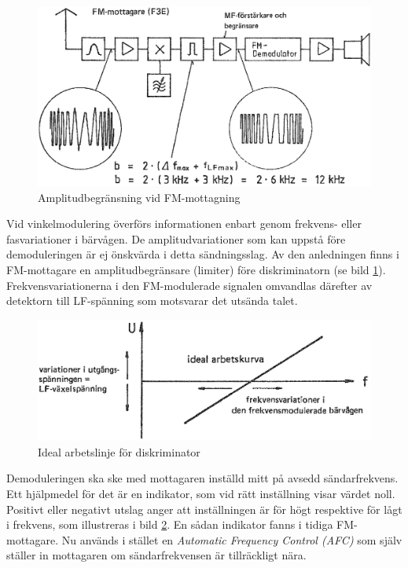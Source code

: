 \begin{figure}
\includegraphics[width=\textwidth]{images/cropped_pdfs/bild_2_3-57.pdf}
\caption{Amplitudbegränsning vid FM-mottagning}
\label{fig:BildII3-57}
\end{figure}

Vid vinkelmodulering överförs informationen enbart genom frekvens-
eller fasvariationer i bärvågen.
De amplitudvariationer som kan uppstå före demoduleringen är ej önskvärda i
detta sändningsslag.
Av den anledningen finns i FM-mottagare en amplitudbegränsare (limiter) före
diskriminatorn (se bild \ref{fig:BildII3-57}).
Frekvensvariationerna i den FM-modulerade signalen omvandlas därefter av
detektorn till LF-spänning som motsvarar det utsända talet.

\begin{figure}
\includegraphics[width=\textwidth]{images/cropped_pdfs/bild_2_3-58.pdf}
\caption{Ideal arbetslinje för diskriminator}
\label{fig:BildII3-58}
\end{figure}

Demoduleringen ska ske med mottagaren inställd mitt på avsedd sändarfrekvens.
Ett hjälpmedel för det är en indikator, som vid rätt inställning visar värdet
noll.
Positivt eller negativt utslag anger att inställningen är för högt respektive
för lågt i frekvens, som illustreras i bild \ref{fig:BildII3-58}.
En sådan indikator fanns i tidiga FM-mottagare.
Nu används i stället en \emph{Automatic Frequency Control (AFC)} som själv
ställer in mottagaren om sändarfrekvensen är tillräckligt nära.

